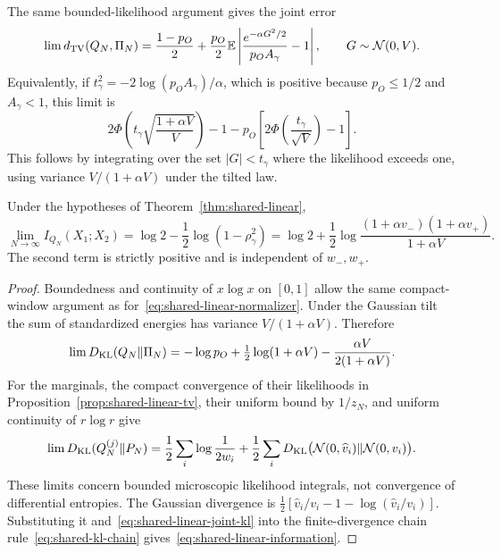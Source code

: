 The same bounded-likelihood argument gives the joint error
\begin{equation}
 \lim d_{\mathrm{TV}}(Q_N,\Pi_N)
 =\frac{1-p_O}{2}+
   \frac{p_O}{2}\mathbb E\left|
       \frac{e^{-\alpha G^2/2}}{p_OA_\gamma}-1\right|,
 \qquad G\sim\mathcal N(0,V).
 \label{eq:shared-linear-joint-tv}
\end{equation}
Equivalently, if $t_\gamma^2=-2\log(p_OA_\gamma)/\alpha$, which is
positive because $p_O\le1/2$ and $A_\gamma<1$, this limit is
\[
 2\Phi\left(t_\gamma\sqrt{\frac{1+\alpha V}{V}}\right)-1
       -p_O\left[2\Phi\left(\frac{t_\gamma}{\sqrt V}\right)-1\right].
\]
This follows by integrating over the set $|G|<t_\gamma$ where the
likelihood exceeds one, using variance $V/(1+\alpha V)$ under the
tilted law.

\begin{proposition}
\label{prop:shared-linear-information}
Under the hypotheses of Theorem~\ref{thm:shared-linear},
\begin{equation}
 \lim_{N\to\infty}I_{Q_N}(X_1;X_2)
 =\log2-\frac12\log(1-\rho_\gamma^2)
 =\log2+\frac12\log
       \frac{(1+\alpha v_-)(1+\alpha v_+)}{1+\alpha V}.
 \label{eq:shared-linear-information}
\end{equation}
The second term is strictly positive and is independent of $w_-,w_+$.
\end{proposition}
\begin{proof}
Boundedness and continuity of $x\log x$ on $[0,1]$ allow the
same compact-window argument as for~\eqref{eq:shared-linear-normalizer}.
Under the Gaussian tilt the sum of standardized energies has variance
$V/(1+\alpha V)$. Therefore
\begin{equation}
 \lim D_{\mathrm{KL}}(Q_N\Vert\Pi_N)
 =-\log p_O+\tfrac12\log(1+\alpha V)
                     -\frac{\alpha V}{2(1+\alpha V)}.
 \label{eq:shared-linear-joint-kl}
\end{equation}
For the marginals, the compact convergence of their likelihoods in
Proposition~\ref{prop:shared-linear-tv}, their uniform bound by $1/z_N$,
and uniform continuity of $r\log r$ give
\begin{equation}
 \lim D_{\mathrm{KL}}(Q_N^{(j)}\Vert P_N)
 =\frac12\sum_i\log\frac1{2w_i}
    +\frac12\sum_iD_{\mathrm{KL}}\bigl(\mathcal N(0,\widehat v_i)
                                   \Vert\mathcal N(0,v_i)\bigr).
 \label{eq:shared-linear-marginal-kl}
\end{equation}
These limits concern bounded microscopic likelihood integrals, not
convergence of differential entropies. The Gaussian divergence is
$\tfrac12[\widehat v_i/v_i-1-\log(\widehat v_i/v_i)]$.
Substituting it and~\eqref{eq:shared-linear-joint-kl}
into the finite-divergence chain rule~\eqref{eq:shared-kl-chain}
gives~\eqref{eq:shared-linear-information}.
\end{proof}

